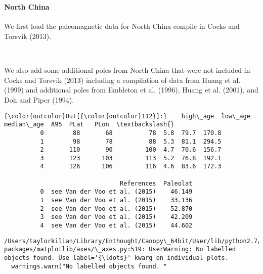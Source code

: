\documentclass[11pt]{article}
\begin{document}
    \begin{center}
    \end{center}
    { \hspace*{\fill} \\}
    
    \paragraph{North China}\label{north-china}

    We first load the paleomagnetic data for North China compile in Cocks
and Torsvik (2013).



    \begin{center}
    \end{center}
    { \hspace*{\fill} \\}
    
    We also add some additional poles from North China that were not
included in Cocks and Torsvik (2013) including a compilation of data
from Huang et al. (1999) and additional poles from Embleton et al.
(1996), Huang et al. (2001), and Doh and Piper (1994).


            \begin{Verbatim}[commandchars=\\\{\}]
{\color{outcolor}Out[{\color{outcolor}112}]:}    high\_age  low\_age  median\_age  A95  PLat   PLon  \textbackslash{}
          0        88       68          78  5.8  79.7  170.8   
          1        98       78          88  5.3  81.1  294.5   
          2       110       90         100  4.7  70.6  156.7   
          3       123      103         113  5.2  76.8  192.1   
          4       126      106         116  4.6  83.6  172.3   
          
                                References  Paleolat  
          0  see Van der Voo et al. (2015)    46.149  
          1  see Van der Voo et al. (2015)    33.136  
          2  see Van der Voo et al. (2015)    52.870  
          3  see Van der Voo et al. (2015)    42.209  
          4  see Van der Voo et al. (2015)    44.602  
\end{Verbatim}
        

    \begin{Verbatim}[commandchars=\\\{\}]
/Users/taylorkilian/Library/Enthought/Canopy\_64bit/User/lib/python2.7/site-packages/matplotlib/axes/\_axes.py:519: UserWarning: No labelled objects found. Use label='{\ldots}' kwarg on individual plots.
  warnings.warn("No labelled objects found. "
    \end{Verbatim}
\end{document}
